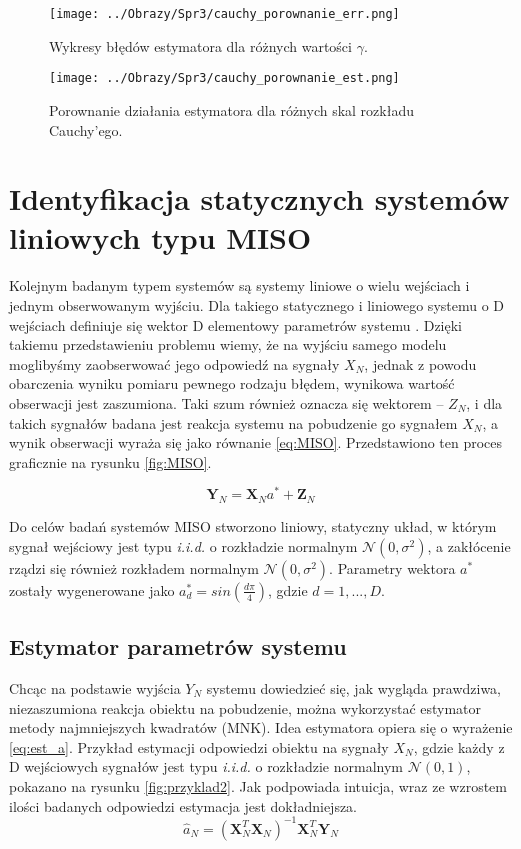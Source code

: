 \documentclass[12pt,a4paper]{article}
\begin{document}
\begin{figure}[H]
\centering
\texttt{[image: ../Obrazy/Spr3/cauchy\_porownanie\_err.png]} 
\caption{Wykresy błędów estymatora dla różnych wartości $\gamma$.}
\label{fig:cauchy_L}
\end{figure}

\begin{figure}[H]
\centering
\texttt{[image: ../Obrazy/Spr3/cauchy\_porownanie\_est.png]} 
\caption{Porownanie działania estymatora dla różnych skal rozkładu Cauchy'ego.}
\label{fig:cauchy_est}
\end{figure}


\newpage
\section{Identyfikacja statycznych systemów liniowych typu MISO}
Kolejnym badanym typem systemów są systemy liniowe o wielu wejściach i jednym obserwowanym wyjściu. 
Dla takiego statycznego i liniowego systemu o D wejściach definiuje się wektor D elementowy parametrów systemu .
Dzięki takiemu przedstawieniu problemu wiemy, że na wyjściu samego modelu moglibyśmy zaobserwować jego odpowiedź na sygnały $X_{N}$, jednak z powodu obarczenia wyniku pomiaru pewnego rodzaju błędem, wynikowa wartość obserwacji jest zaszumiona.
Taki szum również oznacza się wektorem -- $Z_{N}$, i dla takich sygnałów badana jest reakcja systemu na pobudzenie go sygnałem $X_{N}$, a wynik obserwacji wyraża się jako równanie \ref{eq:MISO}. Przedstawiono ten proces graficznie na rysunku \ref{fig:MISO}.

\begin{equation}\label{eq:MISO}
\textbf{Y}_{N} = \textbf{X}_{N}a^{*}+\textbf{Z}_{N}
\end{equation}

Do celów badań systemów MISO stworzono liniowy, statyczny układ, w którym sygnał wejściowy jest typu \textit{i.i.d.} o rozkładzie normalnym $\mathcal{N}(0,\sigma^{2})$, a zakłócenie rządzi się również rozkładem normalnym $\mathcal{N}(0,\sigma^{2})$.
Parametry wektora $a^{*}$ zostały wygenerowane jako $a^{*}_{d} = sin(\frac{d\pi}{4})$, gdzie $d=1,...,D$.

\subsection{Estymator parametrów systemu}
Chcąc na podstawie wyjścia $Y_{N}$ systemu dowiedzieć się, jak wygląda prawdziwa, niezaszumiona reakcja obiektu na pobudzenie, można wykorzystać estymator metody najmniejszych kwadratów (MNK).
Idea estymatora opiera się o wyrażenie \ref{eq:est_a}.
Przykład estymacji odpowiedzi obiektu na sygnały $X_{N}$, gdzie każdy z D wejściowych sygnałów jest typu \textit{i.i.d.} o rozkładzie normalnym $\mathcal{N}(0,1)$, pokazano na rysunku \ref{fig:przyklad2}.
Jak podpowiada intuicja, wraz ze wzrostem ilości badanych odpowiedzi estymacja jest dokładniejsza.
\begin{equation}\label{eq:est_a}
\hat{a}_N = (\textbf{X}_N^{T}\textbf{X}_N)^{-1}\textbf{X}_N^{T}\textbf{Y}_N
\end{equation}
\end{document}
